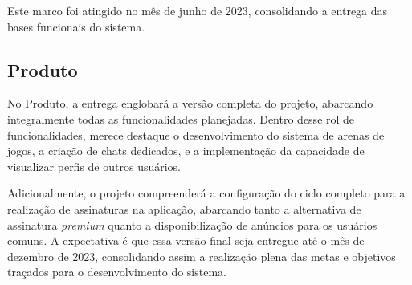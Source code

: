 Este marco foi atingido no mês de junho de 2023, consolidando a entrega das bases funcionais do sistema.

\subsection{Produto}

No Produto, a entrega englobará a versão completa do projeto, abarcando integralmente todas as funcionalidades planejadas. Dentro desse rol de funcionalidades, merece destaque o desenvolvimento do sistema de arenas de jogos, a criação de chats dedicados, e a implementação da capacidade de visualizar perfis de outros usuários.

Adicionalmente, o projeto compreenderá a configuração do ciclo completo para a realização de assinaturas na aplicação, abarcando tanto a alternativa de assinatura \textit{premium} quanto a disponibilização de anúncios para os usuários comuns. A expectativa é que essa versão final seja entregue até o mês de dezembro de 2023, consolidando assim a realização plena das metas e objetivos traçados para o desenvolvimento do sistema.